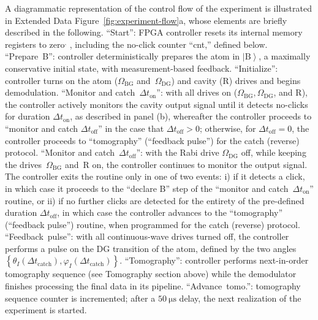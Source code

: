 \documentclass[
	 			preprint,     		superscriptaddress, 																longbibliography,
		amsmath, amssymb,
		aps,  prb,   		floatfix,
		linenumbers     
	]{revtex4-1}
\newcommand{\ket}[1]{\left|#1\right>}
\begin{document}
\label{sec:experiment-flow}
A diagrammatic representation of the control flow of the experiment is illustrated in Extended Data Figure~\ref{fig:experiment-flow}a, whose elements are briefly described in the following.
``Start'': FPGA controller resets its internal memory registers to zero\cite{Ofek2016}$^,$ , including the no-click counter ``cnt,'' defined below. 
``Prepare~B'': controller deterministically prepares the atom in $\ket{\mathrm{B}}$, a maximally conservative initial state, with measurement-based feedback.
``Initialize'':  controller turns on the atom ($\Omega_\mathrm{BG}$ and~$\Omega_\mathrm{DG}$) and cavity ($\mathrm{R}$) drives and begins demodulation.
``Monitor and catch~$\Delta t_\mathrm{on}$'': with all drives on ($\Omega_\mathrm{BG}, \Omega_\mathrm{DG}$, and $\mathrm{R}$), the controller actively monitors the cavity  output signal until it detects no-clicks for duration $\Delta t_\mathrm{on}$, as described in panel (b), whereafter the controller proceeds to ``monitor and catch $\Delta t_\mathrm{off}$''  in the case that $\Delta t_\mathrm{off}>0$; otherwise, for $\Delta t_\mathrm{off}=0$, the controller proceeds to ``tomography''  (``feedback pulse'') for the catch (reverse) protocol.
``Monitor and catch~$\Delta t_\mathrm{off}$'': with the Rabi drive $\Omega_\mathrm{DG}$ off, while keeping the drives~$\Omega_\mathrm{BG}$ and~R on, the controller continues to monitor the output signal. The controller exits the routine only in one of two events: i) if it detects a click, in which case it proceeds to the ``declare B'' step of the ``monitor and catch~$\Delta t _\mathrm{on}$'' routine, or ii) if no further clicks are detected for the entirety of the pre-defined duration $\Delta t_\mathrm{off}$, in which case the controller advances to  the ``tomography'' (``feedback pulse'')  routine, when programmed for the catch (reverse) protocol.
``Feedback~pulse'': with all continuous-wave drives turned off, the controller performs a pulse on the DG transition of the atom, defined by the two angles $\left\{\theta_{I}\left(\Delta t_{\mathrm{catch}}\right),\varphi_{I}\left(\Delta t_{\mathrm{catch}}\right)\right\}$.
``Tomography'':  controller performs  next-in-order tomography sequence (see Tomography section above) while the demodulator finishes processing the final data in its pipeline. 
``Advance~tomo.'': tomography sequence counter is incremented; after a $50~\mathrm{\mu s}$ delay, the next realization of the experiment is started.
\end{document}
